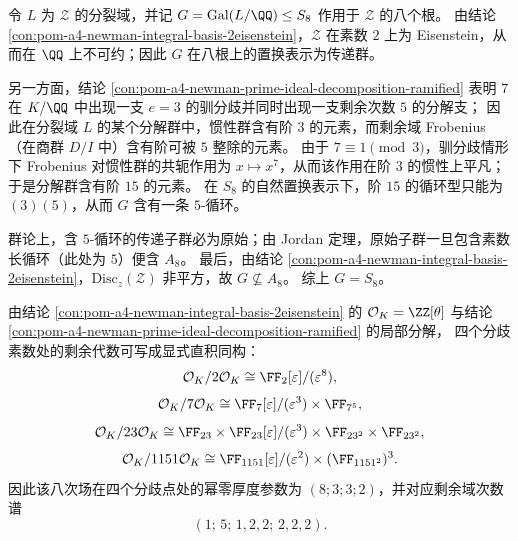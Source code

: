\begin{conclusion}[“两素数证书”强制 \texorpdfstring{$S_8$}{S8}：由 \(p=2\) 的 Eisenstein、\(p=7\) 的 \((3)(5)\) 与非平方判别式]\label{con:pom-a4-newman-two-prime-s8}
令 \(L\) 为 \(\mathcal Z\) 的分裂域，并记 \(G=\mathrm{Gal}(L/\QQ)\le S_8\) 作用于 \(\mathcal Z\) 的八个根。
由结论 \ref{con:pom-a4-newman-integral-basis-2eisenstein}，\(\mathcal Z\) 在素数 \(2\) 上为 Eisenstein，从而在 \(\QQ\) 上不可约；因此 \(G\) 在八根上的置换表示为传递群。
\par
另一方面，结论 \ref{con:pom-a4-newman-prime-ideal-decomposition-ramified} 表明 \(7\) 在 \(K/\QQ\) 中出现一支 \(e=3\) 的驯分歧并同时出现一支剩余次数 \(5\) 的分解支；
因此在分裂域 \(L\) 的某个分解群中，惯性群含有阶 \(3\) 的元素，而剩余域 Frobenius（在商群 \(D/I\) 中）含有阶可被 \(5\) 整除的元素。
由于 \(7\equiv 1\pmod 3\)，驯分歧情形下 Frobenius 对惯性群的共轭作用为 \(x\mapsto x^{7}\)，从而该作用在阶 \(3\) 的惯性上平凡；
于是分解群含有阶 \(15\) 的元素。
在 \(S_8\) 的自然置换表示下，阶 \(15\) 的循环型只能为 \((3)(5)\)，从而 \(G\) 含有一条 \(5\)-循环。
\par
群论上，含 \(5\)-循环的传递子群必为原始；由 Jordan 定理，原始子群一旦包含素数长循环（此处为 \(5\)）便含 \(A_8\)。
最后，由结论 \ref{con:pom-a4-newman-integral-basis-2eisenstein}，\(\mathrm{Disc}_z(\mathcal Z)\) 非平方，故 \(G\nsubseteq A_8\)。
综上 \(G=S_8\)。
\end{conclusion}

\begin{conclusion}\label{con:pom-a4-newman-residue-algebra-decomposition}
由结论 \ref{con:pom-a4-newman-integral-basis-2eisenstein} 的 \(\mathcal O_K=\ZZ[\theta]\) 与结论 \ref{con:pom-a4-newman-prime-ideal-decomposition-ramified} 的局部分解，
四个分歧素数处的剩余代数可写成显式直积同构：
\[
\mathcal O_K/2\mathcal O_K \cong \FF_2[\varepsilon]/(\varepsilon^8),
\]
\[
\mathcal O_K/7\mathcal O_K \cong \FF_7[\varepsilon]/(\varepsilon^3)\times \FF_{7^5},
\]
\[
\mathcal O_K/23\mathcal O_K \cong \FF_{23}\times \FF_{23}[\varepsilon]/(\varepsilon^3)\times \FF_{23^2}\times \FF_{23^2},
\]
\[
\mathcal O_K/1151\mathcal O_K \cong \FF_{1151}[\varepsilon]/(\varepsilon^2)\times (\FF_{1151^2})^{3}.
\]
因此该八次场在四个分歧点处的幂零厚度参数为 \((8;3;3;2)\)，并对应剩余域次数谱
\[
(1;\,5;\,1,2,2;\,2,2,2).
\]
\end{conclusion}

